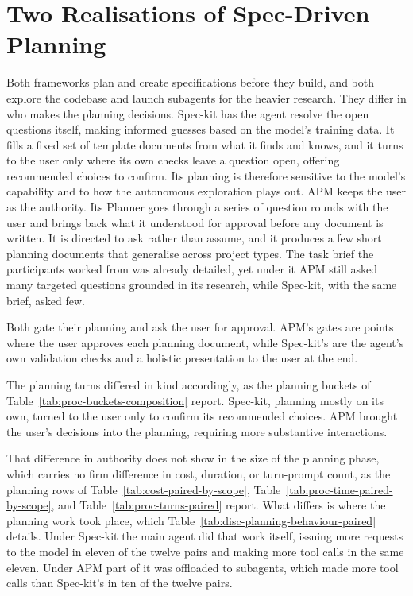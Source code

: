 

\section{Two Realisations of Spec-Driven Planning}
\label{sec:discussions-sdd}

Both frameworks plan and create specifications before they build, and both explore the codebase and launch subagents for the heavier research. They differ in who makes the planning decisions. Spec-kit has the agent resolve the open questions itself, making informed guesses based on the model's training data. It fills a fixed set of template documents from what it finds and knows, and it turns to the user only where its own checks leave a question open, offering recommended choices to confirm. Its planning is therefore sensitive to the model's capability and to how the autonomous exploration plays out. APM keeps the user as the authority. Its Planner goes through a series of question rounds with the user and brings back what it understood for approval before any document is written. It is directed to ask rather than assume, and it produces a few short planning documents that generalise across project types. The task brief the participants worked from was already detailed, yet under it APM still asked many targeted questions grounded in its research, while Spec-kit, with the same brief, asked few.

Both gate their planning and ask the user for approval. APM's gates are points where the user approves each planning document, while Spec-kit's are the agent's own validation checks and a holistic presentation to the user at the end.

The planning turns differed in kind accordingly, as the planning buckets of Table~\ref{tab:proc-buckets-composition} report. Spec-kit, planning mostly on its own, turned to the user only to confirm its recommended choices. APM brought the user's decisions into the planning, requiring more substantive interactions.

That difference in authority does not show in the size of the planning phase, which carries no firm difference in cost, duration, or turn-prompt count, as the planning rows of Table~\ref{tab:cost-paired-by-scope}, Table~\ref{tab:proc-time-paired-by-scope}, and Table~\ref{tab:proc-turns-paired} report. What differs is where the planning work took place, which Table~\ref{tab:disc-planning-behaviour-paired} details. Under Spec-kit the main agent did that work itself, issuing more requests to the model in eleven of the twelve pairs and making more tool calls in the same eleven. Under APM part of it was offloaded to subagents, which made more tool calls than Spec-kit's in ten of the twelve pairs.

